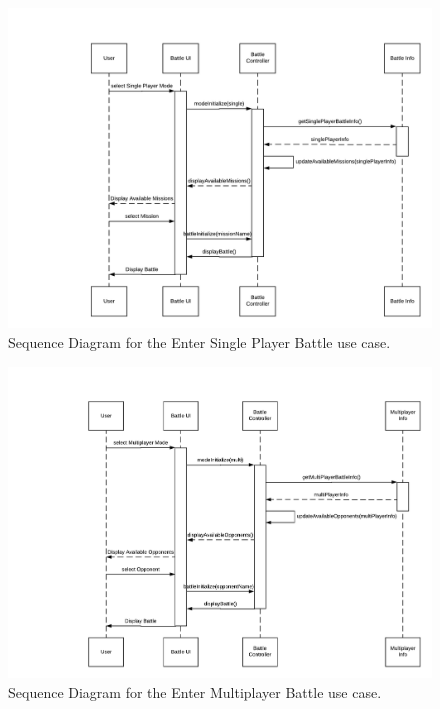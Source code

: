 \documentclass[]{article}
\begin{document}
\begin{figure}[H]
    \centering
    \includegraphics[width=\textwidth]{SD/EnterSinglePlayerBattle.png}
    \caption{Sequence Diagram for the Enter Single Player Battle use case.}
    \label{fig:sd}
\end{figure}

\begin{figure}[H]
    \centering
    \includegraphics[width=\textwidth]{SD/EnterMultiplayerPlayerBattle.png}
    \caption{Sequence Diagram for the Enter Multiplayer Battle use case.}
    \label{fig:sd}
\end{figure}
\end{document}
